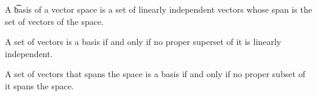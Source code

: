 
A \t{basis} of a vector space is a set of linearly independent vectors whose span is the set of vectors of the space.


\begin{prop}
  A set of vectors is a basis if and only if no proper superset of it is linearly independent.
\end{prop}

\begin{prop}
  A set of vectors that spans the space is a basis if and only if no proper subset of it spans the space.
\end{prop}
